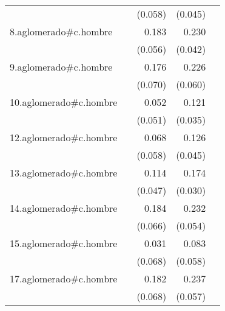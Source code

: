 {\begin{longtable}{l*{4}{D{.}{.}{-1}}}
            &                     &     (0.058)         &     (0.045)         &                     \\
\addlinespace
8.aglomerado#c.hombre&                     &       0.183\sym{**} &       0.230\sym{***}&                     \\
            &                     &     (0.056)         &     (0.042)         &                     \\
\addlinespace
9.aglomerado#c.hombre&                     &       0.176\sym{*}  &       0.226\sym{***}&                     \\
            &                     &     (0.070)         &     (0.060)         &                     \\
\addlinespace
10.aglomerado#c.hombre&                     &       0.052         &       0.121\sym{***}&                     \\
            &                     &     (0.051)         &     (0.035)         &                     \\
\addlinespace
12.aglomerado#c.hombre&                     &       0.068         &       0.126\sym{**} &                     \\
            &                     &     (0.058)         &     (0.045)         &                     \\
\addlinespace
13.aglomerado#c.hombre&                     &       0.114\sym{*}  &       0.174\sym{***}&                     \\
            &                     &     (0.047)         &     (0.030)         &                     \\
\addlinespace
14.aglomerado#c.hombre&                     &       0.184\sym{**} &       0.232\sym{***}&                     \\
            &                     &     (0.066)         &     (0.054)         &                     \\
\addlinespace
15.aglomerado#c.hombre&                     &       0.031         &       0.083         &                     \\
            &                     &     (0.068)         &     (0.058)         &                     \\
\addlinespace
17.aglomerado#c.hombre&                     &       0.182\sym{**} &       0.237\sym{***}&                     \\
            &                     &     (0.068)         &     (0.057)         &                     \\

\end{longtable}}
